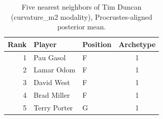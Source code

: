 \begin{table}[htbp]
  \centering\small
  \begin{tabular}{rllc}
    \toprule
    Rank & Player & Position & Archetype \\
    \midrule
    1 & Pau Gasol & F & 1 \\
    2 & Lamar Odom & F & 1 \\
    3 & David West & F & 1 \\
    4 & Brad Miller & F & 1 \\
    5 & Terry Porter & G & 1 \\
    \bottomrule
  \end{tabular}
  \caption{Five nearest neighbors of Tim Duncan (curvature_m2 modality), Procrustes-aligned posterior mean.}
  \label{tab:Tim_Duncan_neighbors_curvature_m2}
\end{table}

